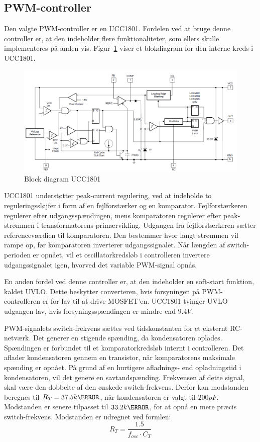 
\subsection{PWM-controller}
Den valgte PWM-controller er en UCC1801\cite{UCC1801}. Fordelen ved at bruge denne controller er, at den indeholder flere funktionaliteter, som ellers skulle implementeres på anden vis. Figur~\ref{fig:PWM_diagram} viser et blokdiagram for den interne kreds i UCC1801.

\begin{figure}[H]
	\centering
	\includegraphics[width=1\linewidth]{../Dokumentation/tex/2iteration/billeder/PWM_block_diagram.png}
	\caption{Block diagram UCC1801}
	\label{fig:PWM_diagram}
\end{figure}

\noindent UCC1801 understøtter peak-current regulering, ved at indeholde to reguleringssløjfer i form af en fejlforstærker og en komparator. Fejlforstærkeren regulerer efter udgangsspændingen, mens komparatoren regulerer efter peak-strømmen i transformatorens primærvikling. Udgangen fra fejlforstærkeren sætter referenceværdien til komparatoren. Den bestemmer hvor langt strømmen vil rampe op, før komparatoren inverterer udgangssignalet. Når længden af switch-perioden er opnået, vil et oscillatorkredsløb i controlleren invertere udgangssignalet igen, hvorved det variable PWM-signal opnås. 

En anden fordel ved denne controller er, at den indeholder en soft-start funktion, kaldet UVLO. Dette beskytter converteren, hvis forsyningen på PWM-controlleren er for lav til at drive MOSFET'en. UCC1801 tvinger UVLO udgangen lav, hvis forsyningsspændingen er mindre end $9.4V$.

PWM-signalets switch-frekvens sættes ved tidskonstanten for et eksternt RC-netværk. Det generer en stigende spænding, da kondensatoren oplades. Spændingen er forbundet til et komparatorkredsløb internt i controlleren. Det aflader kondensatoren gennem en transistor, når komparatorens maksimale spænding er opnået. På grund af en hurtigere afladnings- end opladningstid i kondensatoren, vil det genere en savtandspænding. Frekvensen af dette signal, skal være den dobbelte af den ønskede switch-frekvens. Derfor kan modstanden beregnes til $R_T = 37.5k\ohm$, når kondensatoren er valgt til $200pF$. Modstanden er senere tilpasset til $33.2k\ohm$, for at opnå en mere præcis switch-frekvens. Modstanden er udregnet ved formlen:
\begin{equation} \label{L_2}
R_T = \frac{1.5}{f_{osc} \cdot C_T}
\end{equation} 

